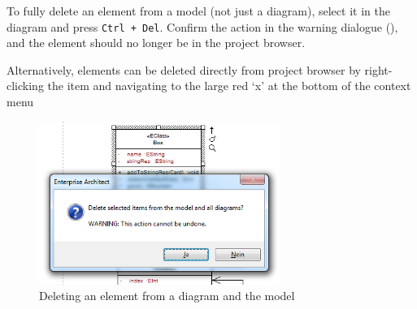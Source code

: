 \begin{stepbystep}
\item To fully delete an element from a model (not just a diagram), select it in the diagram and press \texttt{Ctrl + Del}. Confirm the
action in the warning dialogue (), and the element should no longer be in the project browser.

\vspace{0.5cm}

\item Alternatively, elements can be deleted directly from project browser by right-clicking the item and navigating to the large
red `x' at the bottom of the context menu

\begin{figure}[htbp]
\begin{center}
  \includegraphics[width=0.7\textwidth]{../../org.moflon.doc.handbook.05_miscellaneous/1_grokkingEA/03_delVSRem/ea_deleteWarning}
  \caption{Deleting an element from a diagram and the model}  
  \label{ea:deleteWarning}
\end{center}
\end{figure}  

\end{stepbystep}
